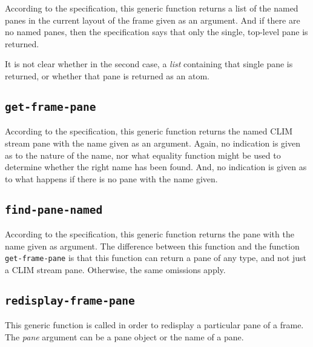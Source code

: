According to the specification, this generic function returns a list
of the named panes in the current layout of the frame given as an
argument.  And if there are no named panes, then the specification
says that only the single, top-level pane is returned.

It is not clear whether in the second case, a \emph{list} containing
that single pane is returned, or whether that pane is returned as an
atom.

\subsection{\texttt{get-frame-pane}}

According to the specification, this generic function returns the
named CLIM stream pane with the name given as an argument.  Again, no
indication is given as to the nature of the name, nor what equality
function might be used to determine whether the right name has been
found.  And, no indication is given as to what happens if there is no
pane with the name given.

\subsection{\texttt{find-pane-named}}

According to the specification, this generic function returns the
pane with the name given as argument.  The difference between this
function and the function \texttt{get-frame-pane} is that this
function can return a pane of any type, and not just a CLIM stream
pane.  Otherwise, the same omissions apply.

\subsection{\texttt{redisplay-frame-pane}}

This generic function is called in order to redisplay a particular
pane of a frame.  The \textit{pane} argument can be a pane object or
the name of a pane.
